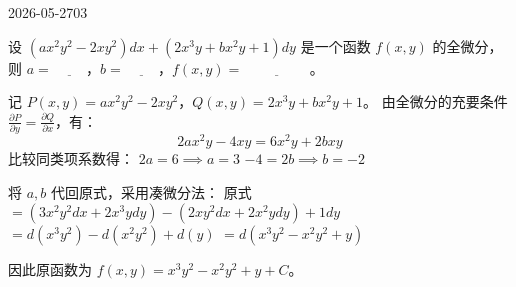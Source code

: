 \begin{mistake}{2026-05-27}{03}

\begin{problemcontent}
设 \((ax^2y^2 - 2xy^2)dx + (2x^3y + bx^2y + 1)dy\) 是一个函数 \(f(x,y)\) 的全微分，则 \(a = \underline{\hspace{1cm}}\)，\(b = \underline{\hspace{1cm}}\)，\(f(x,y) = \underline{\hspace{2cm}}\)。
\end{problemcontent}

\begin{solutioncontent}
记 \(P(x,y) = ax^2y^2 - 2xy^2\)，\(Q(x,y) = 2x^3y + bx^2y + 1\)。
由全微分的充要条件 \(\frac{\partial P}{\partial y} = \frac{\partial Q}{\partial x}\)，有：
\[ 2ax^2y - 4xy = 6x^2y + 2bxy \]
比较同类项系数得：
\(2a = 6 \implies a=3\)
\(-4 = 2b \implies b=-2\)

将 \(a,b\) 代回原式，采用凑微分法：
原式 \(= (3x^2y^2 dx + 2x^3y dy) - (2xy^2 dx + 2x^2y dy) + 1 dy\)
\(= d(x^3y^2) - d(x^2y^2) + d(y)\)
\(= d(x^3y^2 - x^2y^2 + y)\)

因此原函数为 \(f(x,y) = x^3y^2 - x^2y^2 + y + C\)。
\end{solutioncontent}


\end{mistake}
